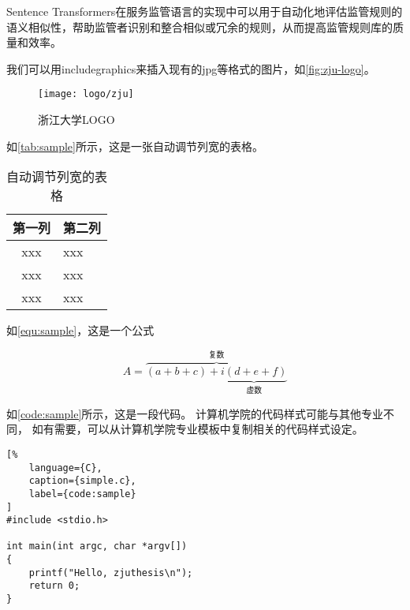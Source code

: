 Sentence Transformers在服务监管语言的实现中可以用于自动化地评估监管规则的语义相似性，帮助监管者识别和整合相似或冗余的规则，从而提高监管规则库的质量和效率。












\par 我们可以用includegraphics来插入现有的jpg等格式的图片，如\autoref{fig:zju-logo}。

\begin{figure}[ht]
    \centering
    \texttt{[image: logo/zju]}
    \caption{\label{fig:zju-logo}浙江大学LOGO}
\end{figure}

\par 如\autoref{tab:sample}所示，这是一张自动调节列宽的表格。

\begin{table}[ht]
    \caption{\label{tab:sample}自动调节列宽的表格}
    \begin{tabularx}{\linewidth}{|c|X<{\centering}|}
        \hline
        第一列 & 第二列 \\ \hline
        xxx & xxx \\ \hline
        xxx & xxx \\ \hline
        xxx & xxx \\ \hline
    \end{tabularx}
\end{table}

\par 如\autoref{equ:sample}，这是一个公式

\begin{equation}
    \label{equ:sample}
    A=\overbrace{(a+b+c)+\underbrace{i(d+e+f)}_{\text{虚数}}}^{\text{复数}}
\end{equation}

\par 如\autoref{code:sample}所示，这是一段代码。
计算机学院的代码样式可能与其他专业不同，
如有需要，可以从计算机学院专业模板中复制相关的代码样式设定。

\begin{lstlisting}[%
    language={C},
    caption={simple.c},
    label={code:sample}
]
#include <stdio.h>

int main(int argc, char *argv[])
{
    printf("Hello, zjuthesis\n");
    return 0;
}
\end{lstlisting}

